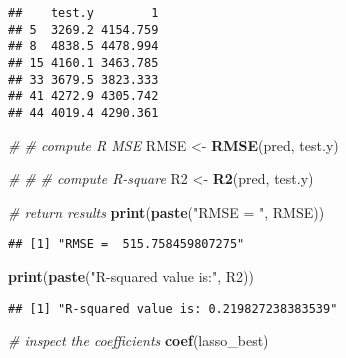 \documentclass[
]{article}
\newenvironment{Shaded}{\begin{snugshade}}{\end{snugshade}}
\newcommand{\CommentTok}[1]{\textcolor[rgb]{0.56,0.35,0.01}{\textit{#1}}}
\newcommand{\KeywordTok}[1]{\textcolor[rgb]{0.13,0.29,0.53}{\textbf{#1}}}
\newcommand{\NormalTok}[1]{#1}
\newcommand{\StringTok}[1]{\textcolor[rgb]{0.31,0.60,0.02}{#1}}
\begin{document}
\begin{verbatim}
##    test.y        1
## 5  3269.2 4154.759
## 8  4838.5 4478.994
## 15 4160.1 3463.785
## 33 3679.5 3823.333
## 41 4272.9 4305.742
## 44 4019.4 4290.361
\end{verbatim}

\begin{Shaded}
\begin{Highlighting}[]
\CommentTok{# # compute R MSE}
\NormalTok{RMSE <-}\StringTok{ }\KeywordTok{RMSE}\NormalTok{(pred, test.y)}

\CommentTok{# }
\CommentTok{# # compute R-square}
\NormalTok{R2 <-}\StringTok{ }\KeywordTok{R2}\NormalTok{(pred, test.y)}

\CommentTok{# return results}
\KeywordTok{print}\NormalTok{(}\KeywordTok{paste}\NormalTok{(}\StringTok{"RMSE = "}\NormalTok{, RMSE))}
\end{Highlighting}
\end{Shaded}

\begin{verbatim}
## [1] "RMSE =  515.758459807275"
\end{verbatim}

\begin{Shaded}
\begin{Highlighting}[]
\KeywordTok{print}\NormalTok{(}\KeywordTok{paste}\NormalTok{(}\StringTok{"R-squared value is:"}\NormalTok{, R2))}
\end{Highlighting}
\end{Shaded}

\begin{verbatim}
## [1] "R-squared value is: 0.219827238383539"
\end{verbatim}

\begin{Shaded}
\begin{Highlighting}[]
\CommentTok{# inspect the coefficients}
\KeywordTok{coef}\NormalTok{(lasso_best)}
\end{Highlighting}
\end{Shaded}
\end{document}
